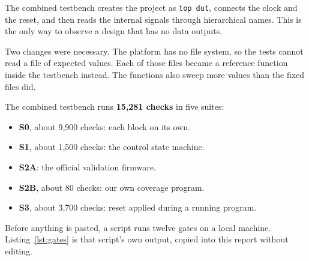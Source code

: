 \documentclass[11pt,a4paper]{article}
\begin{document}
The combined testbench creates the project as \texttt{top dut}, connects the clock and the
reset, and then reads the internal signals through hierarchical names. This is the only way
to observe a design that has no data outputs.

Two changes were necessary. The platform has no file system, so the tests cannot read a file
of expected values. Each of those files became a reference function inside the testbench
instead. The functions also sweep more values than the fixed files did.

The combined testbench runs \textbf{15{,}281 checks} in five suites:

\begin{itemize}[leftmargin=1.35em,itemsep=0pt,topsep=2pt]
\item \textbf{S0}, about 9{,}900 checks: each block on its own.
\item \textbf{S1}, about 1{,}500 checks: the control state machine.
\item \textbf{S2A}: the official validation firmware.
\item \textbf{S2B}, about 80 checks: our own coverage program.
\item \textbf{S3}, about 3{,}700 checks: reset applied during a running program.
\end{itemize}

Before anything is pasted, a script runs twelve gates on a local machine. Listing~\ref{lst:gates}
is that script's own output, copied into this report without editing.
\end{document}

